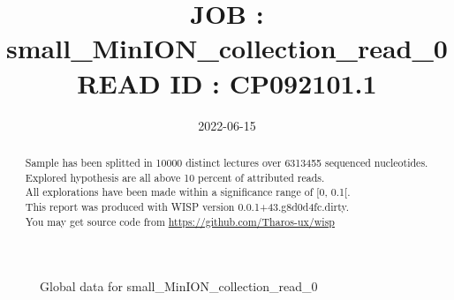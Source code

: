 \documentclass[12pt]{article}
\title{JOB : small\_MinION\_collection\_read\_0\\[0.2em]\smaller{}READ ID : CP092101.1}
\date{2022-06-15}
\begin{document}
\maketitle
\begin{abstract}
\begin{sloppypar}
Sample has been splitted in 10000 distinct lectures over 6313455 sequenced nucleotides.\\
Explored hypothesis are all above 10 percent of attributed reads.\\
All explorations have been made within a significance range of [0, 0.1[.\\
This report was produced with WISP version 0.0.1+43.g8d0d4fc.dirty. \\
You may get source code from \url{https://github.com/Tharos-ux/wisp}
\end{sloppypar}
\end{abstract}\begin{figure}[h]
\centering


\caption{Global data for small\_MinION\_collection\_read\_0}
\label{f-Global data for small\_MinION\_collection\_read\_0}
\end{figure}
\end{document}
